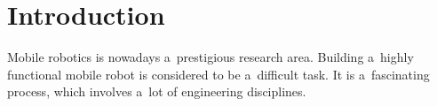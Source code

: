 \chapter{Introduction}
\label{chap:intro}
  Mobile robotics is nowadays a~prestigious research area. Building a~highly functional 
  mobile robot is considered to be a~difficult task. 
  It is a~fascinating process, which
  involves a~lot of engineering disciplines.
  



